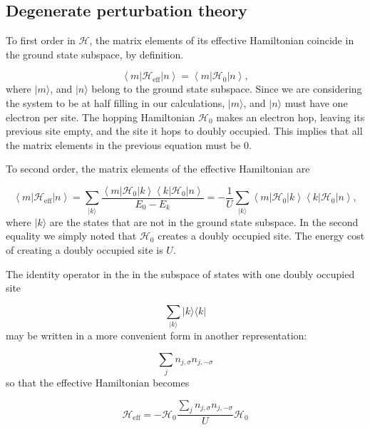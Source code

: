 \subsection{Degenerate perturbation theory}

To first order in $\mathcal{H}$, the matrix elements of its effective Hamiltonian coincide in the ground state subspace, by definition.

\begin{equation}
\left\langle m | \mathcal{H}_{\text{eff}} | n \right\rangle = \left\langle m | \mathcal{H}_0 | n \right\rangle ,
\end{equation}
where $| m \rangle$, and $| n \rangle$ belong to the ground state subspace.
Since we are considering the system to be at half filling in our calculations, $| m\rangle$, and $| n \rangle$ must have one electron per site.
The hopping Hamiltonian $\mathcal{H}_0$ makes an electron hop, leaving its previous site empty, and the site it hops to doubly occupied.
This implies that all the matrix elements in the previous equation must be 0.

To second order, the matrix elements of the effective Hamiltonian are

\begin{equation}
\left \langle m | \mathcal{H}_{\text{eff}} | n \right\rangle = \sum_{ | k \rangle} \frac{\left\langle m | \mathcal{H}_0 | k \right\rangle \left\langle k | \mathcal{H}_0 | n \right\rangle }{E_0 - E_k} =-\frac{1}{U} \sum_{ | k \rangle} \left\langle m | \mathcal{H}_0 | k \right\rangle \left\langle k | \mathcal{H}_0 | n \right\rangle ,
\end{equation}
where $| k \rangle$ are the states that are not in the ground state subspace.
In the second equality we simply noted that $\mathcal{H}_0$ creates a doubly occupied site.
The energy cost of creating a doubly occupied site is $U$. 

The identity operator in the in the subspace of states with one doubly occupied site

\begin{equation*}
\sum_{ | k \rangle} | k \rangle \langle k |
\end{equation*}
may be written in a more convenient form in another representation:

\begin{equation*}
\sum_j n_{j,\sigma} n_{j, -\sigma}
\end{equation*}
so that the effective Hamiltonian becomes

\begin{equation}\label{eq:degPert}
\mathcal{H}_{\text{eff}} = - \mathcal{H}_0 \frac{\sum_j n_{j,\sigma} n_{j, -\sigma}}{U} \mathcal{H}_0
\end{equation}

